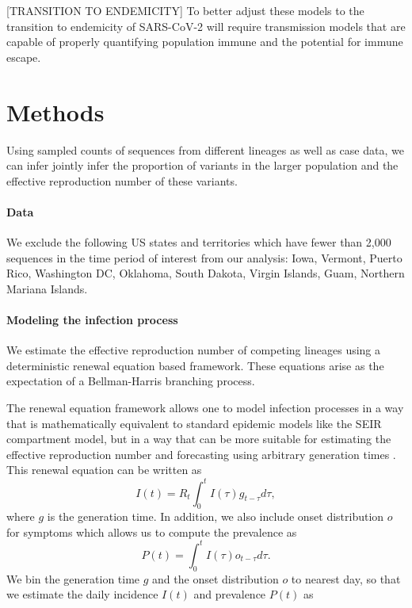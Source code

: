 \documentclass[12pt]{article}
\begin{document}
[TRANSITION TO ENDEMICITY]
To better adjust these models to the transition to endemicity of SARS-CoV-2 will require transmission models that are capable of properly quantifying population immune and the potential for immune escape.

\section{Methods}

Using sampled counts of sequences from different lineages as well as case data, we can infer jointly infer the proportion of variants in the larger population and the effective reproduction number of these variants. 

\paragraph{Data}

We exclude the following US states and territories which have fewer than 2,000 sequences in the time period of interest from our analysis: Iowa, Vermont, Puerto Rico, Washington DC, Oklahoma, South Dakota, Virgin Islands, Guam, Northern Mariana Islands.

\paragraph{Modeling the infection process}%

We estimate the effective reproduction number of competing lineages using a deterministic renewal equation based framework. These equations arise as the expectation of a Bellman-Harris branching process. \cite{Bellman1948} 

The renewal equation framework allows one to model infection processes in a way that is mathematically equivalent to standard epidemic models like the SEIR compartment model, but in a way that can be more suitable for estimating the effective reproduction number and forecasting using arbitrary generation times \cite{Champredon2018}. This renewal equation can be written as
\begin{equation}
  I(t) = R_{t} \int_{0}^{t} I(\tau)g_{t-\tau} d\tau,
\end{equation}
where $g$ is the generation time. 
In addition, we also include onset distribution $o$ for symptoms which allows us to compute the prevalence as
\begin{equation}
  P(t) = \int_{0}^{t} I(\tau) o_{t-\tau} d \tau.
\end{equation}
We bin the generation time $g$ and the onset distribution $o$ to nearest day, so that we estimate the daily incidence $I(t)$ and prevalence $P(t)$ as
\end{document}
